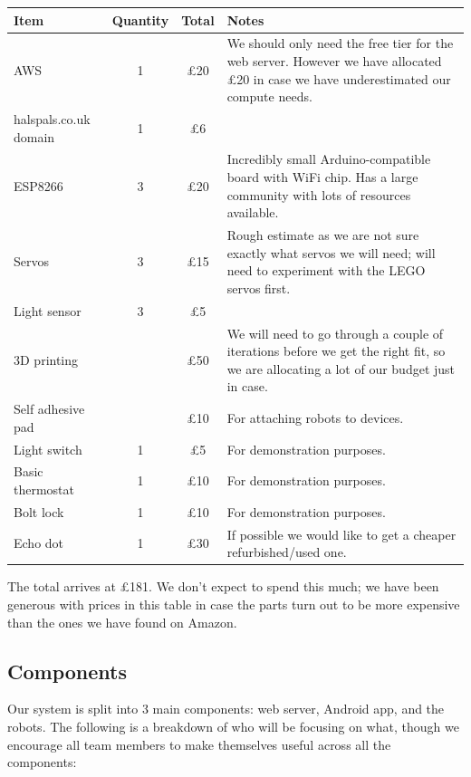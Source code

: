 \documentclass[onecolumn]{IEEEtran}
\begin{document}
\begin{center}
    \begin{tabularx}{\linewidth}{|l|c|c|L|}
        \hline
        \textbf{Item} & \textbf{Quantity} & \textbf{Total} & \textbf{Notes} \\
        \hline
        AWS & 1 & £20 & We should only need the free tier for the web server. However we have allocated £20 in case we have underestimated our compute needs. \\
        \hline
        halspals.co.uk domain & 1 & £6 &  \\
        \hline
        ESP8266 & 3 & £20 & Incredibly small Arduino-compatible board with WiFi chip. Has a large community with lots of resources available. \\
        \hline
        Servos & 3 & £15 & Rough estimate as we are not sure exactly what servos we will need; will need to experiment with the LEGO servos first. \\
        \hline
        Light sensor & 3 & £5 &  \\
        \hline
        3D printing &  & £50 & We will need to go through a couple of iterations before we get the right fit, so we are allocating a lot of our budget just in case. \\
        \hline
        Self adhesive pad & & £10 & For attaching robots to devices.\\
        \hline
        Light switch & 1 & £5 & For demonstration purposes.\\
        \hline
        Basic thermostat & 1 & £10 & For demonstration purposes.\\
        \hline
        Bolt lock & 1 & £10 & For demonstration purposes.\\
        \hline
        Echo dot & 1 & £30 & If possible we would like to get a cheaper refurbished/used one. \\
        \hline
    \end{tabularx}    
\end{center}

The total arrives at £181. We don't expect to spend this much; we have been generous with prices in this table in case the parts turn out to be more expensive than the ones we have found on Amazon.

\subsection{Components}

Our system is split into 3 main components: web server, Android app, and the robots. The following is a breakdown of who will be focusing on what, though we encourage all team members to make themselves useful across all the components:
\end{document}
